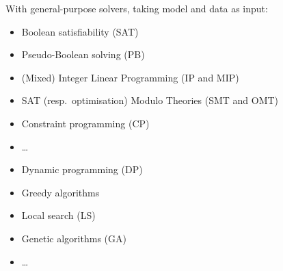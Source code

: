 \documentclass{cons-beamer}
\begin{document}
\begin{frame}
  \begin{examples}
    With general-purpose solvers, taking model and data as input:
    \begin{itemize}
      \item Boolean satisfiability (SAT)
      \item Pseudo-Boolean solving (PB)
      \item (Mixed) Integer Linear Programming (IP and MIP)
      \item SAT (resp.\ optimisation) Modulo Theories (SMT and OMT)
      \item Constraint programming (CP)
      \item \dots
    \end{itemize}
  \end{examples}
  \begin{examples}
    \begin{itemize}
      \item Dynamic programming (DP)
      \item Greedy algorithms
      \item Local search (LS)
      \item Genetic algorithms (GA)
      \item \dots
    \end{itemize}
  \end{examples}
\end{frame}
\end{document}
